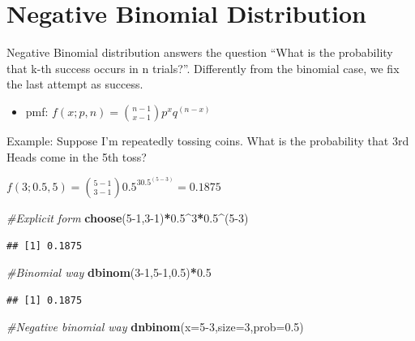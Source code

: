 \documentclass[]{book}
\newenvironment{Shaded}{\begin{snugshade}}{\end{snugshade}}
\newcommand{\CommentTok}[1]{\textcolor[rgb]{0.56,0.35,0.01}{\textit{#1}}}
\newcommand{\DataTypeTok}[1]{\textcolor[rgb]{0.13,0.29,0.53}{#1}}
\newcommand{\DecValTok}[1]{\textcolor[rgb]{0.00,0.00,0.81}{#1}}
\newcommand{\FloatTok}[1]{\textcolor[rgb]{0.00,0.00,0.81}{#1}}
\newcommand{\KeywordTok}[1]{\textcolor[rgb]{0.13,0.29,0.53}{\textbf{#1}}}
\newcommand{\NormalTok}[1]{#1}
\newcommand{\OperatorTok}[1]{\textcolor[rgb]{0.81,0.36,0.00}{\textbf{#1}}}
\providecommand{\tightlist}{%
  \setlength{\itemsep}{0pt}\setlength{\parskip}{0pt}}
\theoremstyle{definition}
\theoremstyle{definition}
\theoremstyle{definition}
\theoremstyle{remark}
\begin{document}
\hypertarget{negative-binomial-distribution}{%
\section{Negative Binomial
Distribution}\label{negative-binomial-distribution}}

Negative Binomial distribution answers the question ``What is the
probability that k-th success occurs in n trials?''. Differently from
the binomial case, we fix the last attempt as success.

\begin{itemize}
\tightlist
\item
  pmf: \(f(x;p,n) = \binom{n-1}{x-1} p^xq^{(n-x)}\)
\end{itemize}

Example: Suppose I'm repeatedly tossing coins. What is the probability
that 3rd Heads come in the 5th toss?

\(f(3;0.5,5) = \binom{5-1}{3-1} 0.5^30.5^{(5-3)} = 0.1875\)

\begin{Shaded}
\begin{Highlighting}[]
\CommentTok{#Explicit form}
\KeywordTok{choose}\NormalTok{(}\DecValTok{5-1}\NormalTok{,}\DecValTok{3-1}\NormalTok{)}\OperatorTok{*}\FloatTok{0.5}\OperatorTok{^}\DecValTok{3}\OperatorTok{*}\FloatTok{0.5}\OperatorTok{^}\NormalTok{(}\DecValTok{5-3}\NormalTok{)}
\end{Highlighting}
\end{Shaded}

\begin{verbatim}
## [1] 0.1875
\end{verbatim}

\begin{Shaded}
\begin{Highlighting}[]
\CommentTok{#Binomial way}
\KeywordTok{dbinom}\NormalTok{(}\DecValTok{3-1}\NormalTok{,}\DecValTok{5-1}\NormalTok{,}\FloatTok{0.5}\NormalTok{)}\OperatorTok{*}\FloatTok{0.5}
\end{Highlighting}
\end{Shaded}

\begin{verbatim}
## [1] 0.1875
\end{verbatim}

\begin{Shaded}
\begin{Highlighting}[]
\CommentTok{#Negative binomial way}
\KeywordTok{dnbinom}\NormalTok{(}\DataTypeTok{x=}\DecValTok{5-3}\NormalTok{,}\DataTypeTok{size=}\DecValTok{3}\NormalTok{,}\DataTypeTok{prob=}\FloatTok{0.5}\NormalTok{)}
\end{Highlighting}
\end{Shaded}
\end{document}
